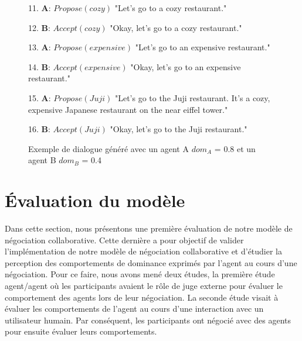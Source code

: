 \begin{figure}[!t]
\begin{minipage}{\textwidth}
{\begin{addmargin}[1em]{2em}
					
					11. \textbf{A}: $Propose(cozy)$ "Let's go to a cozy restaurant."
					
					
					12. \hspace*{3mm}\textbf{B}: $Accept(cozy)$ "Okay, let's go to a cozy \hspace*{4mm} restaurant."
					
					
					13. \textbf{A}: $Propose(expensive)$ "Let's go to an expensive \hspace*{3mm} restaurant."
					
					
					14. \hspace*{3mm}\textbf{B}: $Accept(expensive)$ "Okay, let's go to an expensive \hspace*{4mm} restaurant."
					
					
					15. \textbf{A}: $Propose(Juji)$ "Let's go to the Juji restaurant. It's a \hspace*{3mm} cozy, expensive Japanese restaurant on the near \hspace*{3mm} eiffel tower."
					
					
					16. \hspace*{3mm}\textbf{B}: $Accept(Juji)$ "Okay, let's go to the Juji \hspace*{4mm} restaurant."
					\vspace{0.5 em}
				\end{addmargin}
			}
	\end{minipage}
			\caption{\label{fig: ex-dialogue} Exemple de dialogue généré avec un agent A $dom_A$ = 0.8 et un agent B $dom_B$ = 0.4}
\end{figure}
	
	\section{Évaluation du modèle}
		
		Dans cette section, nous présentons une première évaluation de notre modèle de négociation collaborative. Cette dernière a pour objectif de valider l'implémentation de notre modèle de négociation collaborative et d'étudier la perception des comportements de dominance exprimés par l'agent au cours d'une négociation. 
		Pour ce faire, nous avons mené deux études, la première étude agent/agent où les participants avaient le rôle de juge externe pour évaluer le comportement des agents lors de leur négociation.
		La seconde étude visait à évaluer les comportements de l'agent au cours d'une interaction avec un utilisateur humain. Par conséquent, les participants ont négocié avec des agents pour ensuite évaluer leurs comportements. 
		
